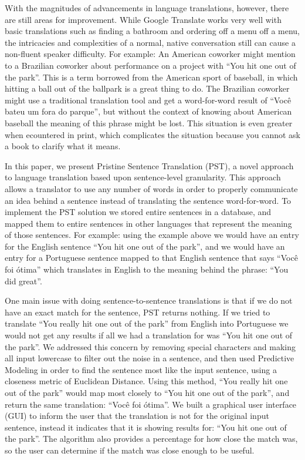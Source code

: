 \documentclass[runningheads]{llncs}
\begin{document}
	With the magnitudes of advancements in language translations, however, there are still areas for improvement. While Google Translate works very well with basic translations such as finding a bathroom and ordering off a menu off a menu, the intricacies and complexities of a normal, native conversation still can cause a non-fluent speaker difficulty. For example: An American coworker might mention to a Brazilian coworker about performance on a project with ``You hit one out of the park''. This is a term borrowed from the American sport of baseball, in which hitting a ball out of the ballpark is a great thing to do. The Brazilian coworker might use a traditional translation tool and get a word-for-word result of ``Você bateu um fora do parque'', but without the context of knowing about American baseball the meaning of this phrase might be lost. This situation is even greater when ecountered in print, which complicates the situation because you cannot ask a book to clarify what it means.
	
	In this paper, we present Pristine Sentence Translation (PST), a novel approach to language translation based upon sentence-level granularity. This approach allows a translator to use any number of words in order to properly communicate an idea behind a sentence instead of translating the sentence word-for-word. To implement the PST solution we stored entire sentences in a database, and mapped them to entire sentences in other languages that represent the meaning of those sentences. For example: using the example above we would have an entry for the English sentence ``You hit one out of the park'', and we would have an entry for a Portuguese sentence mapped to that English sentence that says ``Você foi ótima'' which translates in English to the meaning behind the phrase: ``You did great''. 

	One main issue with doing sentence-to-sentence translations is that if we do not have an exact match for the sentence, PST returns nothing. If we tried to translate ``You really hit one out of the park'' from English into Portuguese we would not get any results if all we had a translation for was ``You hit one out of the park''. We addressed this concern by removing special characters and making all input lowercase to filter out the noise in a sentence, and then used Predictive Modeling in order to find the sentence most like the input sentence, using a closeness metric of Euclidean Distance. Using this method, ``You really hit one out of the park'' would map most closely to ``You hit one out of the park'', and return the same translation: ``Você foi ótima''. We built a graphical user interface (GUI) to inform the user that the translation is not for the original input sentence, instead it indicates that it is showing results for: ``You hit one out of the park''. The algorithm also provides a percentage for how close the match was, so the user can determine if the match was close enough to be useful.
	
\end{document}

